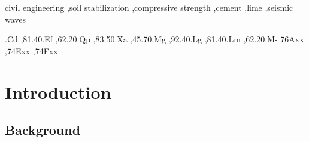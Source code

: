 \documentclass[final,3p,times,onecolumn,authoryear]{elsarticle}
\begin{document}
\begin{frontmatter}
\begin{keyword}

civil engineering \sep soil stabilization \sep compressive strength \sep cement \sep lime \sep seismic waves

.Cd \sep 81.40.Ef \sep 62.20.Qp \sep 83.50.Xa \sep 45.70.Mg \sep 92.40.Lg \sep 81.40.Lm \sep 62.20.M-
\MSC 76Axx \sep 74Exx \sep 74Fxx

\end{keyword}

\end{frontmatter}


\linenumbers
\section{Introduction}

\subsection{Background}
\end{document}
